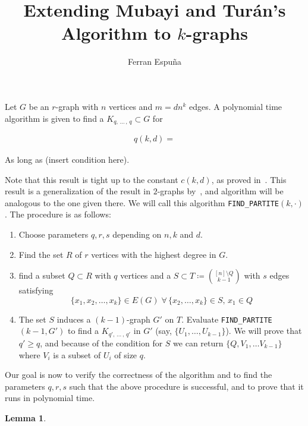 \documentclass[12pt]{article}
\author{Ferran Espuña}
\date{} %
\newtheorem{lemma}[thm]{Lemma}
\begin{document}
    \title{Extending Mubayi and Turán's Algorithm to $k$-graphs}

    \maketitle

    Let $G$ be an $r$-graph with $n$ vertices and $m = dn^k$ edges.
    A polynomial time algorithm is given to find a $K_{q,\, \ldots\, ,\, q} \subset G$ for

    \begin{align*}
        q (k, d) = %
        \label{eq:q}
    \end{align*}

    As long as (insert condition here). %
    
    Note that this result is tight up to the constant $c(k, d)$,
    as proved in~\cite{Erods1964}.
    This result is a generalization of the result in $2$-graphs by~\cite{MUBAYI2010174},
    and algorithm will be analogous to the one given there.
    We will call this algorithm \verb|FIND_PARTITE|$(k, \cdot)$.
    The procedure is as follows:

    \begin{enumerate}
        \item Choose parameters $q, r, s$ depending on $n, k$ and $d$.
        \item Find the set $R$ of $r$ vertices with the highest degree in $G$.

        \item find a subset $Q \subset R$ with $q$ vertices and a
        $S \subset T \coloneqq \binom{[n] \setminus Q}{k-1}$ with $s$ edges satisfying
        \[\{x_1, x_2, \ldots, x_k\} \in E(G) \; \forall \, \{x_2, \ldots, x_k\} \in S, \, x_1 \in Q\]

        \item The set $S$ induces a $(k-1)$-graph $G'$ on $T$.
        Evaluate \verb|FIND_PARTITE|$(k-1, G')$ to find a $K_{q',\, \ldots\, ,\, q'}$ in $G'$
        (say, $\{U_1, \ldots, U_{k-1}\}$). We will prove that $q' \geq q$,
        and because of the condition for $S$ we can return $\{Q, V_1, \ldots V_{k-1}\}$
        where $V_i$ is a subset of $U_i$ of size $q$.

    \end{enumerate}

    Our goal is now to verify the correctness of the algorithm and to find the parameters $q, r, s$
    such that the above procedure is successful, and to prove that it runs in polynomial time.

    \begin{lemma}\label{many_edges}

    \end{lemma}








    
    
\end{document}
